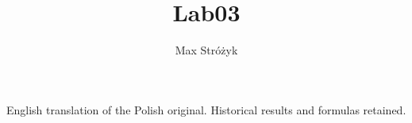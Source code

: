 \documentclass[a4paper, 11pt]{article}
\title{Lab03}
\author{Max Stróżyk}
\begin{document}
\maketitle
\begin{center}\small English translation of the Polish original. Historical results and formulas retained.\end{center}
\tableofcontents


\newpage




\newpage



\newpage




\newpage
\end{document}
